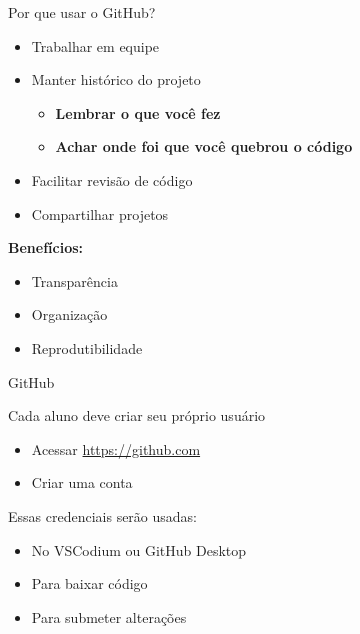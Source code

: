 \documentclass{beamer}
\begin{document}
\begin{frame}{Por que usar o GitHub?}
    
    \begin{itemize}
        \item Trabalhar em equipe
        \item Manter histórico do projeto
        \begin{itemize}
            \item \textbf{Lembrar o que você fez}
            \item \textbf{Achar onde foi que você quebrou o código}
        \end{itemize}
        \item Facilitar revisão de código
        \item Compartilhar projetos

    \end{itemize}
    
    \vspace{0.3cm}
    
    \textbf{Benefícios:}
    \begin{itemize}
        \item Transparência
        \item Organização
        \item Reprodutibilidade
    \end{itemize}
    
\end{frame}

\begin{frame}{GitHub}
    
    Cada aluno deve criar seu próprio usuário
    \begin{itemize}
        \item Acessar \url{https://github.com}
        \item Criar uma conta
    \end{itemize}
    
    \vspace{0.3cm}
    
    Essas credenciais serão usadas:
    \begin{itemize}
        \item No VSCodium ou GitHub Desktop
        \item Para baixar código
        \item Para submeter alterações
    \end{itemize}
    
\end{frame}
\end{document}
